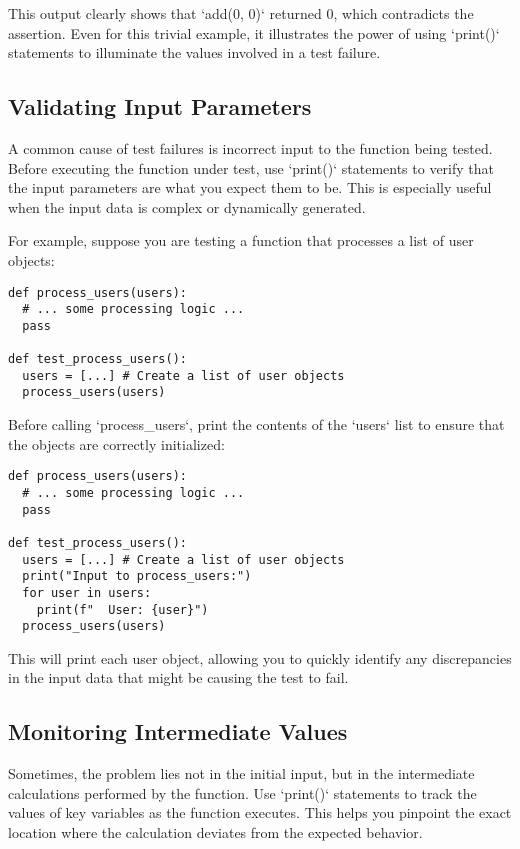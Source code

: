 \documentclass{article}
\begin{document}
{{{{This output clearly shows that `add(0, 0)` returned 0, which contradicts the assertion. Even for this trivial example, it illustrates the power of using `print()` statements to illuminate the values involved in a test failure.

\subsection*{Validating Input Parameters}

A common cause of test failures is incorrect input to the function being tested. Before executing the function under test, use `print()` statements to verify that the input parameters are what you expect them to be. This is especially useful when the input data is complex or dynamically generated.

For example, suppose you are testing a function that processes a list of user objects:

\begin{verbatim}
def process_users(users):
  # ... some processing logic ...
  pass

def test_process_users():
  users = [...] # Create a list of user objects
  process_users(users)
\end{verbatim}

Before calling `process_users`, print the contents of the `users` list to ensure that the objects are correctly initialized:

\begin{verbatim}
def process_users(users):
  # ... some processing logic ...
  pass

def test_process_users():
  users = [...] # Create a list of user objects
  print("Input to process_users:")
  for user in users:
    print(f"  User: {user}")
  process_users(users)
\end{verbatim}

This will print each user object, allowing you to quickly identify any discrepancies in the input data that might be causing the test to fail.

\subsection*{Monitoring Intermediate Values}

Sometimes, the problem lies not in the initial input, but in the intermediate calculations performed by the function. Use `print()` statements to track the values of key variables as the function executes. This helps you pinpoint the exact location where the calculation deviates from the expected behavior.

}}}}
\end{document}
